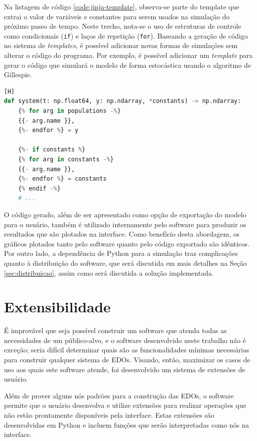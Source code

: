 \documentclass[
	12pt,				%
	openright,			%
	oneside,			%
	a4paper,			%
	main=brazil,
	english,			%
	]{ufsj-abntex2}
\begin{document}
Na listagem de código \ref{code:jinja-template}, observa-se parte do template que extrai o valor de variáveis e constantes para serem usados na simulação do próximo passo de tempo. Neste trecho, nota-se o uso de estruturas de controle como condicionais (\texttt{if}) e laços de repetição (\texttt{for}). Baseando a geração de código no sistema de \textit{templates}, é possível adicionar novas formas de simulações sem alterar o código do programa. Por exemplo, é possível adicionar um \textit{template} para gerar o código que simulará o modelo de forma estocástica usando o algoritmo de Gillespie.

\begin{lstlisting}[language=Python, label=code:jinja-template, caption=Trecho do \textit{template} responsável por extrair o valor de variáveis e constantes][H]
def system(t: np.float64, y: np.ndarray, *constants) -> np.ndarray:
    {% for arg in populations -%}
    {{- arg.name }},
    {%- endfor %} = y

    {%- if constants %}
    {% for arg in constants -%}
    {{- arg.name }},
    {%- endfor %} = constants
    {% endif -%}
    # ...
\end{lstlisting}

O código gerado, além de ser apresentado como opção de exportação do modelo para o usuário, também é utilizado internamente pelo software para produzir os resultados que são plotados na interface. Como benefício desta abordagem, os gráficos plotados tanto pelo software quanto pelo código exportado são idênticos. Por outro lado, a dependência de Python para a simulação traz complicações quanto à distribuição do software, que será discutida em mais detalhes na Seção \ref{sec:distribuicao}, assim como será discutida a solução implementada.

\section{Extensibilidade}
\label{sec:extensibilidade}

É improvável que seja possível construir um software que atenda todas as necessidades de um público-alvo, e o software desenvolvido neste trabalho não é exceção; seria difícil determinar quais são as funcionalidades mínimas necessárias para construir qualquer sistema de EDOs. Visando, então, maximizar os casos de uso aos quais este software atende, foi desenvolvido um sistema de extensões de usuário. 

Além de prover alguns nós padrões para a construção das EDOs, o software permite que o usuário desenvolva e utilize extensões para realizar operações que não estão prontamente disponíveis pela interface. Estas extensões são desenvolvidas em Python e incluem funções que serão interpretadas como nós na interface.
\end{document}

